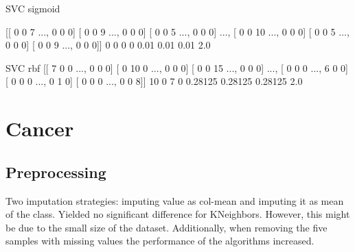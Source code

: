 SVC sigmoid

[[ 0  0  7 ...,  0  0  0]
 [ 0  0  9 ...,  0  0  0]
 [ 0  0  5 ...,  0  0  0]
 ..., 
 [ 0  0 10 ...,  0  0  0]
 [ 0  0  5 ...,  0  0  0]
 [ 0  0  9 ...,  0  0  0]]
0 0 0 0
0.01 0.01 0.01 2.0

SVC rbf
[[ 7  0  0 ...,  0  0  0]
 [ 0 10  0 ...,  0  0  0]
 [ 0  0 15 ...,  0  0  0]
 ..., 
 [ 0  0  0 ...,  6  0  0]
 [ 0  0  0 ...,  0  1  0]
 [ 0  0  0 ...,  0  0  8]]
10 0 7 0
0.28125 0.28125 0.28125 2.0

\section{Cancer}
\subsection{Preprocessing}
Two imputation strategies: imputing value as col-mean and imputing it as mean of the class. Yielded no significant difference for KNeighbors.
However, this might be due to the small size of the dataset. 
Additionally, when removing the five samples with missing values the performance of the algorithms increased. 
